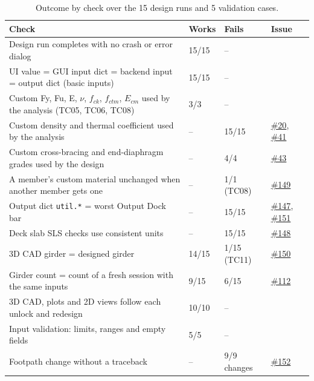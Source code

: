 \documentclass[11pt,a4paper]{article}
\newcommand{\issue}[1]{\href{https://github.com/Nidhikhare12/OsdagBridge/issues/#1}{\##1}}
\begin{document}
\begin{table}[htbp]
\caption{Outcome by check over the 15 design runs and 5 validation cases.}\label{tab:outcome}
\small
\begin{tabularx}{\linewidth}{@{}Ylll@{}}
\toprule
\textbf{Check} & \textbf{Works} & \textbf{Fails} & \textbf{Issue} \\
\midrule
Design run completes with no crash or error dialog & 15/15 & -- & \\
UI value = GUI input dict = backend input = output dict (basic inputs) & 15/15 & -- & \\
Custom Fy, Fu, E, $\nu$, $f_{ck}$, $f_{ctm}$, $E_{cm}$ used by the analysis (TC05, TC06, TC08) & 3/3 & -- & \\
Custom density and thermal coefficient used by the analysis & -- & 15/15 & \issue{20}, \issue{41} \\
Custom cross-bracing and end-diaphragm grades used by the design & -- & 4/4 & \issue{43} \\
A member's custom material unchanged when another member gets one & -- & 1/1 (TC08) & \issue{149} \\
Output dict \texttt{util.*} = worst Output Dock bar & -- & 15/15 & \issue{147}, \issue{151} \\
Deck slab SLS checks use consistent units & -- & 15/15 & \issue{148} \\
3D CAD girder = designed girder & 14/15 & 1/15 (TC11) & \issue{150} \\
Girder count = count of a fresh session with the same inputs & 9/15 & 6/15 & \issue{112} \\
3D CAD, plots and 2D views follow each unlock and redesign & 10/10 & -- & \\
Input validation: limits, ranges and empty fields & 5/5 & -- & \\
Footpath change without a traceback & -- & 9/9 changes & \issue{152} \\
\bottomrule
\end{tabularx}
\end{table}
\end{document}
